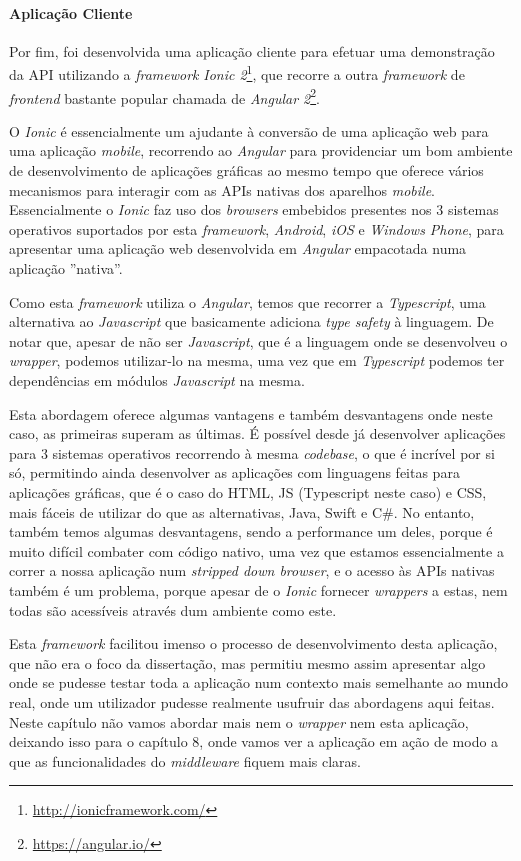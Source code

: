 \paragraph*{Aplicação Cliente}

Por fim, foi desenvolvida uma aplicação cliente para efetuar uma demonstração da API utilizando a \textit{framework} \textit{Ionic 2}\footnote{\url{http://ionicframework.com/}}, que recorre a outra \textit{framework} de \textit{frontend} bastante popular chamada de \textit{Angular 2}\footnote{\url{https://angular.io/}}.

O \textit{Ionic} é essencialmente um ajudante à conversão de uma aplicação web para uma aplicação \textit{mobile}, recorrendo ao \textit{Angular} para providenciar um bom ambiente de desenvolvimento de aplicações gráficas ao mesmo tempo que oferece vários mecanismos para interagir com as APIs nativas dos aparelhos \textit{mobile}. Essencialmente o \textit{Ionic} faz uso dos \textit{browsers} embebidos presentes nos 3 sistemas operativos suportados por esta \textit{framework}, \textit{Android}, \textit{iOS} e \textit{Windows Phone}, para apresentar uma aplicação web desenvolvida em \textit{Angular} empacotada numa aplicação ''nativa''.

Como esta \textit{framework} utiliza o \textit{Angular}, temos que recorrer a \textit{Typescript}, uma alternativa ao \textit{Javascript} que basicamente adiciona \textit{type safety} à linguagem. De notar que, apesar de não ser \textit{Javascript}, que é a linguagem onde se desenvolveu o \textit{wrapper}, podemos utilizar-lo na mesma, uma vez que em \textit{Typescript} podemos ter dependências em módulos \textit{Javascript} na mesma.

Esta abordagem oferece algumas vantagens e também desvantagens onde neste caso, as primeiras superam as últimas. É possível desde já desenvolver aplicações para 3 sistemas operativos recorrendo à mesma \textit{codebase}, o que é incrível por si só, permitindo ainda desenvolver as aplicações com linguagens feitas para aplicações gráficas, que é o caso do HTML, JS (Typescript neste caso) e CSS, mais fáceis de utilizar do que as alternativas, Java, Swift e C\#. No entanto, também temos algumas desvantagens, sendo a performance um deles, porque é muito difícil combater com código nativo, uma vez que estamos essencialmente a correr a nossa aplicação num \textit{stripped down browser}, e o acesso às APIs nativas também é um problema, porque apesar de o \textit{Ionic} fornecer \textit{wrappers} a estas, nem todas são acessíveis através dum ambiente como este.

Esta \textit{framework} facilitou imenso o processo de desenvolvimento desta aplicação, que não era o foco da dissertação, mas permitiu mesmo assim apresentar algo onde se pudesse testar toda a aplicação num contexto mais semelhante ao mundo real, onde um utilizador pudesse realmente usufruir das abordagens aqui feitas. Neste capítulo não vamos abordar mais nem o \textit{wrapper} nem esta aplicação, deixando isso para o capítulo 8, onde vamos ver a aplicação em ação de modo a que as funcionalidades do \textit{middleware} fiquem mais claras.